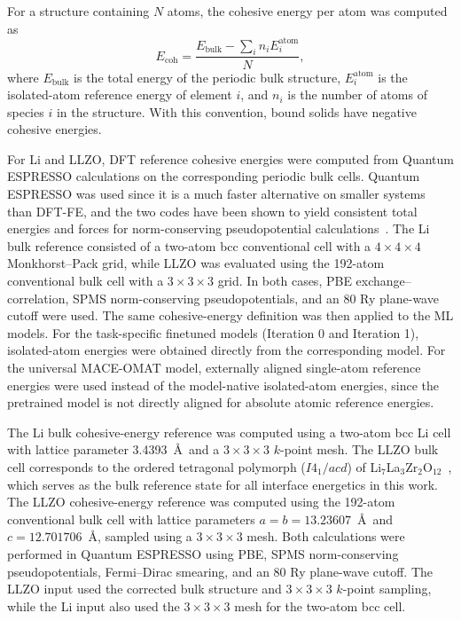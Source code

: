 \documentclass[12pt,a4paper,oneside]{book}
\begin{document}
For a structure containing \(N\) atoms, the cohesive energy per atom was computed as
\begin{equation}
E_{\mathrm{coh}} = \frac{E_{\mathrm{bulk}} - \sum_i n_i E_i^{\mathrm{atom}}}{N},
\end{equation}
where \(E_{\mathrm{bulk}}\) is the total energy of the periodic bulk structure, \(E_i^{\mathrm{atom}}\) is the isolated-atom reference energy of element \(i\), and \(n_i\) is the number of atoms of species \(i\) in the structure. With this convention, bound solids have negative cohesive energies.

For Li and LLZO, DFT reference cohesive energies were computed from Quantum ESPRESSO calculations on the corresponding periodic bulk cells. Quantum ESPRESSO was used since it is a much faster alternative on smaller systems than DFT-FE, and the two codes have been shown to yield consistent total energies and forces
for norm-conserving pseudopotential calculations~\cite{Das2022}. The Li bulk reference consisted of a two-atom bcc conventional cell with a \(4\times4\times4\) Monkhorst--Pack grid, while LLZO was evaluated using the 192-atom conventional bulk cell with a \(3\times3\times3\) grid. In both cases, PBE exchange--correlation, SPMS norm-conserving pseudopotentials, and an 80 Ry plane-wave cutoff were used. The same cohesive-energy definition was then applied to the ML models. For the task-specific finetuned models (Iteration 0 and Iteration 1), isolated-atom energies were obtained directly from the corresponding model. For the universal MACE-OMAT model, externally aligned single-atom reference energies were used instead of the model-native isolated-atom energies, since the pretrained model is not directly aligned for absolute atomic reference energies.

The Li bulk cohesive-energy reference was computed using a two-atom bcc Li cell with lattice parameter 3.4393~\AA\ and a \(3\times3\times3\) \(k\)-point mesh. The LLZO bulk cell corresponds to the ordered tetragonal polymorph 
($I4_1/acd$) of Li$_7$La$_3$Zr$_2$O$_{12}$~\cite{Murugan2007}, 
which serves as the bulk reference state for all interface energetics 
in this work. The LLZO cohesive-energy reference was computed using the 192-atom conventional bulk cell with lattice parameters \(a=b=13.23607\)~\AA\ and \(c=12.701706\)~\AA, sampled using a \(3\times3\times3\) mesh. Both calculations were performed in Quantum ESPRESSO using PBE, SPMS norm-conserving pseudopotentials, Fermi--Dirac smearing, and an 80 Ry plane-wave cutoff. The LLZO input used the corrected bulk structure and \(3\times3\times3\) \(k\)-point sampling, while the Li input also used the \(3\times3\times3\) mesh for the two-atom bcc cell. 
\end{document}
